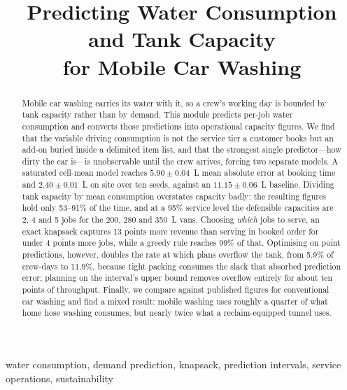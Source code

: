 \documentclass[conference]{IEEEtran}
\begin{document}
\title{Predicting Water Consumption and Tank Capacity\\for Mobile Car Washing}

\author{
}

\maketitle

\begin{abstract}
Mobile car washing carries its water with it, so a crew's working day is bounded by tank
capacity rather than by demand. This module predicts per-job water consumption and converts
those predictions into operational capacity figures. We find that the variable driving
consumption is not the service tier a customer books but an add-on buried inside a delimited
item list, and that the strongest single predictor---how dirty the car is---is unobservable
until the crew arrives, forcing two separate models. A saturated cell-mean model reaches
$5.90 \pm 0.04$~L mean absolute error at booking time and $2.40 \pm 0.01$~L on site over ten
seeds, against an $11.15 \pm 0.06$~L baseline. Dividing tank capacity by mean consumption
overstates capacity badly: the resulting figures hold only 53--91\% of the time, and at a
95\% service level the defensible capacities are 2, 4 and 5 jobs for the 200, 280 and 350~L
vans. Choosing \emph{which} jobs to serve, an exact knapsack captures 13 points more revenue
than serving in booked order for under 4 points more jobs, while a greedy rule reaches 99\%
of that. Optimising on point predictions, however, doubles the rate at which plans overflow
the tank, from 5.9\% of crew-days to 11.9\%, because tight packing consumes the slack that
absorbed prediction error; planning on the interval's upper bound removes overflow entirely
for about ten points of throughput. Finally, we compare against published figures for
conventional car washing and find a mixed result: mobile washing uses roughly a quarter of
what home hose washing consumes, but nearly twice what a reclaim-equipped tunnel uses.
\end{abstract}

\begin{IEEEkeywords}
water consumption, demand prediction, knapsack, prediction intervals, service operations,
sustainability
\end{IEEEkeywords}
\end{document}
